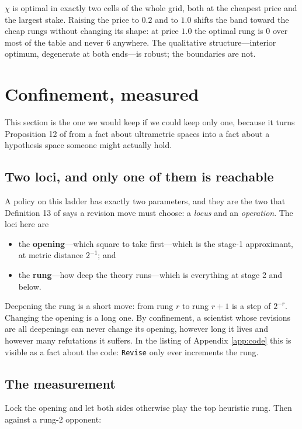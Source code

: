 \documentclass[11pt]{article}
\theoremstyle{definition}
\theoremstyle{plain}
\theoremstyle{remark}
\begin{document}
$\chi$ is optimal in exactly two cells of the whole grid, both at the cheapest
price and the largest stake. Raising the price to $0.2$ and to $1.0$ shifts the
band toward the cheap rungs without changing its shape: at price $1.0$ the
optimal rung is $0$ over most of the table and never $6$ anywhere. The
qualitative structure---interior optimum, degenerate at both ends---is robust;
the boundaries are not.

\section{Confinement, measured}\label{sec:confine}

This section is the one we would keep if we could keep only one, because it
turns Proposition 12 of \cite{scientist} from a fact about ultrametric spaces
into a fact about a hypothesis space someone might actually hold.

\subsection{Two loci, and only one of them is reachable}

A policy on this ladder has exactly two parameters, and they are the two that
Definition 13 of \cite{scientist} says a revision move must choose: a
\emph{locus} and an \emph{operation}. The loci here are

\begin{itemize}
\item the \textbf{opening}---which square to take first---which is the stage-1
approximant, at metric distance $2^{-1}$; and
\item the \textbf{rung}---how deep the theory runs---which is everything at
stage 2 and below.
\end{itemize}

Deepening the rung is a short move: from rung $r$ to rung $r+1$ is a step of
$2^{-r}$. Changing the opening is a long one. By confinement, a scientist whose
revisions are all deepenings can never change its opening, however long it lives
and however many refutations it suffers. In the listing of Appendix
\ref{app:code} this is visible as a fact about the code: \texttt{Revise} only
ever increments the rung.

\subsection{The measurement}

Lock the opening and let both sides otherwise play the top heuristic rung. Then
against a rung-2 opponent:
\end{document}
